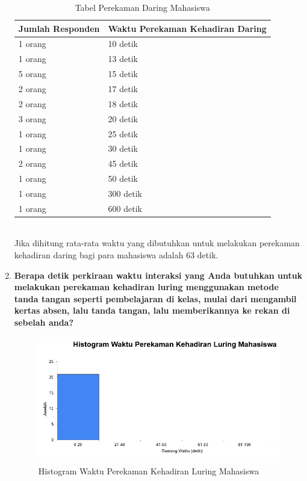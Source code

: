 \begin{enumerate}
\begin{table}[ht]
		\caption{Tabel Perekaman Daring Mahasiswa}
		\centering
		\begin{tabular}{|p{4cm} |p{7cm}|}\hline
			Jumlah Responden &  Waktu Perekaman Kehadiran Daring \\ \hline     
			1 orang &  10 detik\\ \hline 
			1 orang &  13 detik\\ \hline 
			5 orang &  15 detik\\ \hline 
			2 orang &  17 detik\\ \hline 
			2 orang &  18 detik\\ \hline 
			3 orang &  20 detik\\ \hline
			1 orang &  25 detik\\ \hline 
			1 orang &  30 detik\\ \hline 
			2 orang &  45 detik\\ \hline
			1 orang &  50 detik\\ \hline 
			1 orang &  300 detik\\ \hline 
			1 orang &  600 detik\\ \hline		
		\end{tabular}
		\label{tab:daringMahasiswa}
	\end{table}\\
	Jika dihitung rata-rata waktu yang dibutuhkan untuk melakukan perekaman kehadiran daring bagi para mahasiswa adalah 63 detik.
	\newpage
	\item \textbf{Berapa detik perkiraan waktu interaksi yang Anda butuhkan untuk melakukan perekaman kehadiran luring menggunakan metode tanda tangan seperti pembelajaran di kelas, mulai dari mengambil kertas absen, lalu tanda tangan, lalu memberikannya ke rekan di sebelah anda?}
	\begin{figure}[H]
		\centering
		\includegraphics[scale=0.7]{Gambar/LuringMahasiswa.jpg}
		\caption{Histogram Waktu Perekaman Kehadiran Luring Mahasiswa} 

\end{figure}
\end{enumerate}

